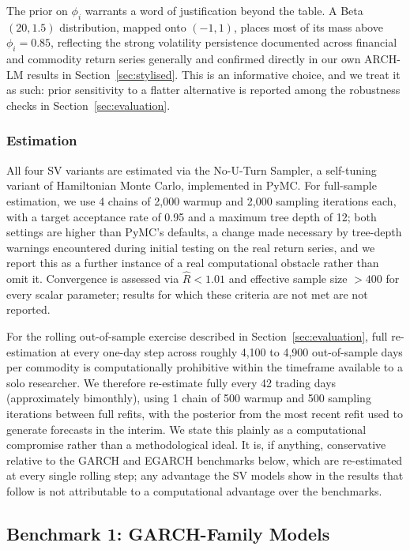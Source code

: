 \documentclass[preprint,12pt,authoryear]{elsarticle}
\begin{document}
The prior on $\phi_i$ warrants a word of justification beyond the table. A Beta$(20, 1.5)$ distribution, mapped onto $(-1,1)$, places most of its mass above $\phi_i = 0.85$, reflecting the strong volatility persistence documented across financial and commodity return series generally and confirmed directly in our own ARCH-LM results in Section~\ref{sec:stylised}. This is an informative choice, and we treat it as such: prior sensitivity to a flatter alternative is reported among the robustness checks in Section~\ref{sec:evaluation}.

\subsubsection{Estimation}

All four SV variants are estimated via the No-U-Turn Sampler, a self-tuning variant of Hamiltonian Monte Carlo, implemented in PyMC. For full-sample estimation, we use 4 chains of 2,000 warmup and 2,000 sampling iterations each, with a target acceptance rate of 0.95 and a maximum tree depth of 12; both settings are higher than PyMC's defaults, a change made necessary by tree-depth warnings encountered during initial testing on the real return series, and we report this as a further instance of a real computational obstacle rather than omit it. Convergence is assessed via $\hat{R} < 1.01$ and effective sample size $> 400$ for every scalar parameter; results for which these criteria are not met are not reported.

For the rolling out-of-sample exercise described in Section~\ref{sec:evaluation}, full re-estimation at every one-day step across roughly 4,100 to 4,900 out-of-sample days per commodity is computationally prohibitive within the timeframe available to a solo researcher. We therefore re-estimate fully every 42 trading days (approximately bimonthly), using 1 chain of 500 warmup and 500 sampling iterations between full refits, with the posterior from the most recent refit used to generate forecasts in the interim. We state this plainly as a computational compromise rather than a methodological ideal. It is, if anything, conservative relative to the GARCH and EGARCH benchmarks below, which are re-estimated at every single rolling step; any advantage the SV models show in the results that follow is not attributable to a computational advantage over the benchmarks.

\subsection{Benchmark 1: GARCH-Family Models}
\label{sec:garch}
\end{document}
